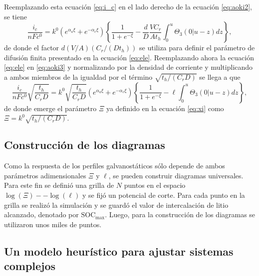 Reemplazando esta ecuación \ref{eq:i_c} en el lado derecho de la ecuación 
\ref{eq:aoki2}, se tiene
\begin{equation}\label{eq:aoki3}
    \frac{i_c}{n F c^0} = k^0 \left(e^{\alpha_a \xi} + e^{-\alpha_c \xi}\right) \left\{ \frac{1}{1+e^{-\xi}} - \frac{d}{D} \frac{V C_r}{A t_h} \int_0^u \Theta_3(0|u - z) dz \right\},
\end{equation}
de donde el factor $d (V/A) (C_r / (D t_h))$ se utiliza para definir el 
parámetro de difusión finita presentado en la ecuación \ref{eq:ele}. Reemplazando 
ahora la ecuación \ref{eq:ele} en \ref{eq:aoki3} y normalizando por la densidad 
de corriente y multiplicando a ambos miembros de la igualdad por el término 
$\sqrt{t_h / (C_r D)}$ se llega a que
\begin{equation}\label{eq:aoki4}
    \frac{i_c}{n F c^0} \sqrt{\frac{t_h}{C_r D}} = k^0 \sqrt{\frac{t_h}{C_r D}}\left(e^{\alpha_a \xi} + e^{-\alpha_c \xi}\right) \left\{ \frac{1}{1+e^{-\xi}} - \ell \int_0^u \Theta_3(0|u - z) dz \right\},
\end{equation}
de donde emerge el parámetro $\Xi$ ya definido en la ecuación \ref{eq:xi} como 
$\Xi = k^0 \sqrt{t_h / (C_r D)}$.


\subsection{Construcción de los diagramas}

Como la respuesta de los perfiles galvanostáticos sólo depende de ambos parámetros
adimensionales $\Xi$ y $\ell$, se pueden construir diagramas universales. Para 
este fin se definió una grilla de $N$ puntos en el espacio 
$\log(\Xi)--\log(\ell)$ y se fijó un potencial de corte. Para cada punto en la 
grilla se realizó la simulación y se guardó el valor de intercalación de litio
alcanzado, denotado por $\text{SOC}_{\max}$. Luego, para la construcción de los
diagramas se utilizaron unos miles de puntos.


\subsection{Un modelo heurístico para ajustar sistemas complejos}

